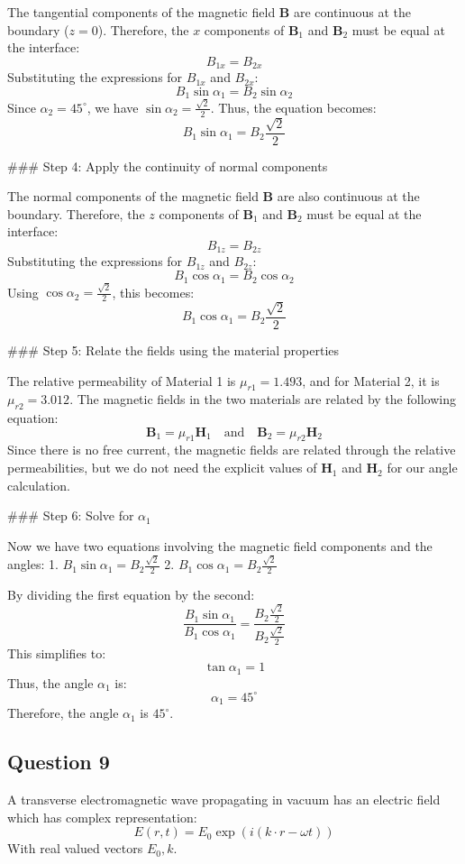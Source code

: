 \documentclass{article}
\begin{document}
The tangential components of the magnetic field $\mathbf{B}$ are continuous at the boundary ($z = 0$). Therefore, the $x$ components of $\mathbf{B}_1$ and $\mathbf{B}_2$ must be equal at the interface:
\[
B_{1x} = B_{2x}
\]
Substituting the expressions for $B_{1x}$ and $B_{2x}$:
\[
B_1 \sin \alpha_1 = B_2 \sin \alpha_2
\]
Since $\alpha_2 = 45^\circ$, we have $\sin \alpha_2 = \frac{\sqrt{2}}{2}$. Thus, the equation becomes:
\[
B_1 \sin \alpha_1 = B_2 \frac{\sqrt{2}}{2}
\]

### Step 4: Apply the continuity of normal components

The normal components of the magnetic field $\mathbf{B}$ are also continuous at the boundary. Therefore, the $z$ components of $\mathbf{B}_1$ and $\mathbf{B}_2$ must be equal at the interface:
\[
B_{1z} = B_{2z}
\]
Substituting the expressions for $B_{1z}$ and $B_{2z}$:
\[
B_1 \cos \alpha_1 = B_2 \cos \alpha_2
\]
Using $\cos \alpha_2 = \frac{\sqrt{2}}{2}$, this becomes:
\[
B_1 \cos \alpha_1 = B_2 \frac{\sqrt{2}}{2}
\]

### Step 5: Relate the fields using the material properties

The relative permeability of Material 1 is $\mu_{r1} = 1.493$, and for Material 2, it is $\mu_{r2} = 3.012$. The magnetic fields in the two materials are related by the following equation:
\[
\mathbf{B}_1 = \mu_{r1} \mathbf{H}_1 \quad \text{and} \quad \mathbf{B}_2 = \mu_{r2} \mathbf{H}_2
\]
Since there is no free current, the magnetic fields are related through the relative permeabilities, but we do not need the explicit values of $\mathbf{H}_1$ and $\mathbf{H}_2$ for our angle calculation.

### Step 6: Solve for $\alpha_1$

Now we have two equations involving the magnetic field components and the angles:
1. \( B_1 \sin \alpha_1 = B_2 \frac{\sqrt{2}}{2} \)
2. \( B_1 \cos \alpha_1 = B_2 \frac{\sqrt{2}}{2} \)

By dividing the first equation by the second:
\[
\frac{B_1 \sin \alpha_1}{B_1 \cos \alpha_1} = \frac{B_2 \frac{\sqrt{2}}{2}}{B_2 \frac{\sqrt{2}}{2}}
\]
This simplifies to:
\[
\tan \alpha_1 = 1
\]
Thus, the angle $\alpha_1$ is:
\[
\alpha_1 = 45^\circ
\]
Therefore, the angle $\alpha_1$ is $45^\circ$.


\subsection{Question 9}
A transverse electromagnetic wave propagating in vacuum has an electric field which has complex representation:
\[
E(r, t) = E_0 \exp(i (k \cdot r - \omega t))
\]
With real valued vectors \(E_0, k\).
\end{document}
